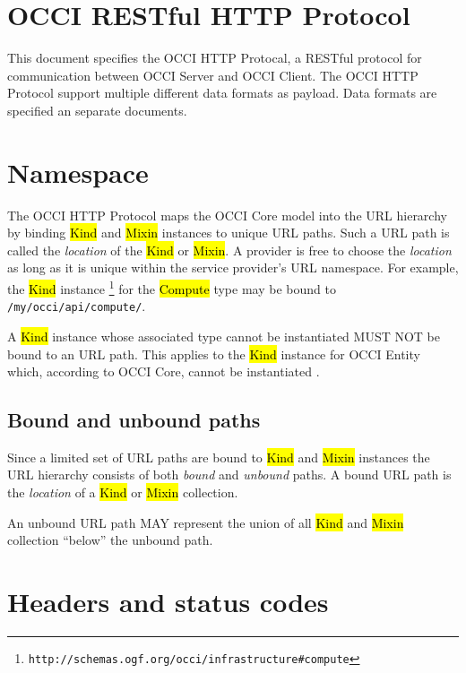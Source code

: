 \documentclass[10pt,a4paper]{article}
\begin{document}
\section{OCCI RESTful HTTP Protocol}

This document specifies the OCCI HTTP Protocal, a RESTful protocol for
communication between OCCI Server and OCCI Client. The OCCI HTTP Protocol
support multiple different data formats as payload. Data formats are specified
an separate documents.

\section{Namespace}

The OCCI HTTP Protocol maps the OCCI Core model into the URL hierarchy by binding
\hl{Kind} and \hl{Mixin} instances to unique URL paths. Such a URL path is called
the {\em location} of the \hl{Kind} or \hl{Mixin}.
A provider is free to choose the {\em location} as long as it is unique
within the service provider's URL namespace.
For example, the \hl{Kind} instance%
\footnote{\tt http://schemas.ogf.org/occi/infrastructure\#compute}
for the \hl{Compute} type may be bound to {\tt /my/occi/api/compute/}.

A \hl{Kind} instance whose associated type cannot be instantiated MUST NOT be
bound to an URL path. This applies to the \hl{Kind} instance for OCCI Entity
which, according to OCCI Core, cannot be instantiated \cite{occi:core}.


\subsection{Bound and unbound paths}

Since a limited set of URL paths are bound to \hl{Kind} and \hl{Mixin}
instances the URL hierarchy consists of both {\em bound} and {\em unbound}
paths.
A bound URL path is the {\em location} of a \hl{Kind} or \hl{Mixin} collection.

An unbound URL path MAY represent the union of all \hl{Kind} and \hl{Mixin}
collection ``below'' the unbound path.

\section{Headers and status codes}

\end{document}

